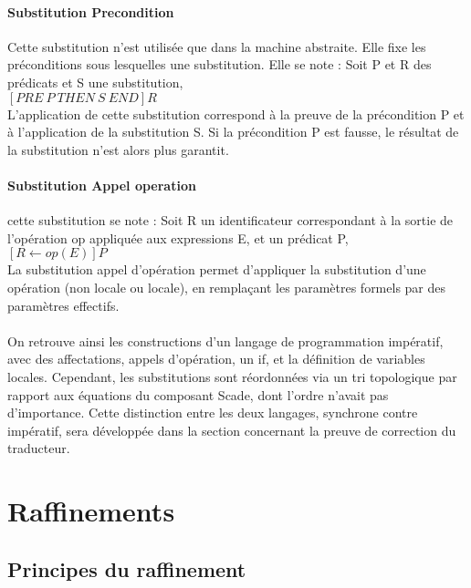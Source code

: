 \paragraph{Substitution Precondition}
Cette substitution n'est utilisée que dans la machine abstraite. Elle fixe les
préconditions sous lesquelles une substitution. Elle se note : Soit P
et R des prédicats et S une substitution,\\ 
$[PRE~ P~ THEN~ S~ END]R$\\
L'application de cette substitution correspond à la preuve de la
précondition P et à l'application de la substitution S. Si la
précondition P est fausse, le résultat de la substitution n'est alors
plus garantit.

\paragraph{Substitution Appel operation}
cette substitution se note : Soit R un identificateur correspondant à la sortie
de l'opération op appliquée aux expressions E, et un prédicat P,\\
$[R\leftarrow op(E)]P$\\
La  substitution appel d’opération permet d’appliquer la substitution
d’une opération (non locale ou locale), en remplaçant les paramètres
formels par des paramètres effectifs. 

\paragraph{}
On retrouve ainsi les constructions d'un langage de programmation
impératif, avec des affectations, appels d'opération, un if, et la
définition de variables locales. Cependant, les substitutions sont
réordonnées via un tri topologique par rapport aux équations du composant
Scade, dont l'ordre n'avait pas d'importance. Cette distinction entre
les deux langages, synchrone contre impératif, sera développée dans la
section concernant la preuve de correction du traducteur.



\section{Raffinements}

\subsection{Principes du raffinement}

